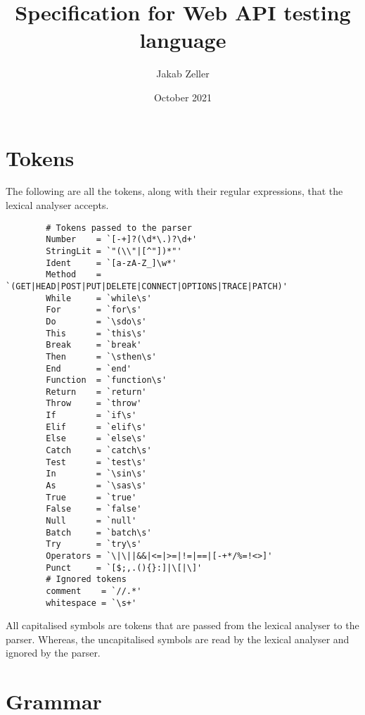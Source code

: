 \documentclass[12pt, letterpaper]{article}
\title{Specification for Web API testing language}
\author{Jakab Zeller}
\date{October 2021}
\begin{document}
\maketitle

\section{Tokens}

The following are all the tokens, along with their regular expressions, that the lexical analyser accepts.

\begin{center}
    \begin{verbatim}
        # Tokens passed to the parser
        Number    = `[-+]?(\d*\.)?\d+'
        StringLit = `"(\\"|[^"])*"'
        Ident     = `[a-zA-Z_]\w*'
        Method    = `(GET|HEAD|POST|PUT|DELETE|CONNECT|OPTIONS|TRACE|PATCH)'
        While     = `while\s'
        For       = `for\s'
        Do        = `\sdo\s'
        This      = `this\s'
        Break     = `break'
        Then      = `\sthen\s'
        End       = `end'
        Function  = `function\s'
        Return    = `return'
        Throw     = `throw'
        If        = `if\s'
        Elif      = `elif\s'
        Else      = `else\s'
        Catch     = `catch\s'
        Test      = `test\s'
        In        = `\sin\s'
        As        = `\sas\s'
        True      = `true'
        False     = `false'
        Null      = `null'
        Batch     = `batch\s'
        Try       = `try\s'
        Operators = `\|\||&&|<=|>=|!=|==|[-+*/%=!<>]'
        Punct     = `[$;,.(){}:]|\[|\]'
        # Ignored tokens
        comment    = `//.*'
        whitespace = `\s+'
    \end{verbatim}
\end{center}

All capitalised symbols are tokens that are passed from the lexical analyser to the parser. Whereas, the uncapitalised symbols are read by the lexical analyser and ignored by the parser.

\section{Grammar}
\end{document}
